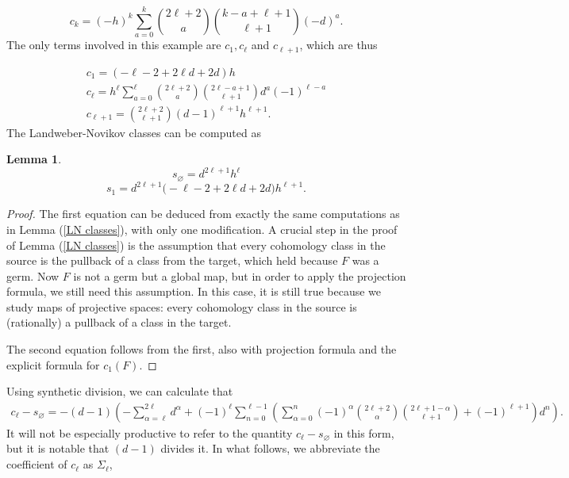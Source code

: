\documentclass[11pt]{article}
\theoremstyle{plain}
\newtheorem{lemma}[fact]{Lemma}
\theoremstyle{definition}
\theoremstyle{definition}
\newcounter{equation}
\let\emptyset\varnothing
\begin{document}
\[
c_k = (-h)^k\sum_{a=0}^k{2\ell+2\choose a}{k-a+\ell+1\choose \ell+1}(-d)^a.
\]
The only terms involved in this example are $c_1, c_\ell$ and $c_{\ell+1}$, which are thus 

\begin{gather*}
c_1=(-\ell-2+2\ell d+2d)h\\
c_\ell = h^\ell\sum_{a=0}^\ell{2\ell+2\choose a}{2\ell-a+1\choose \ell+1}d^a(-1)^{\ell-a}\\
c_{\ell+1} = {2\ell+2\choose \ell+1}(d-1)^{\ell+1}h^{\ell+1}.
\end{gather*}
The Landweber-Novikov classes can be computed as
\begin{lemma}
\[
s_\emptyset = d^{2\ell+1}h^\ell
\]
\[
s_1=d^{2\ell+1}\big(-\ell-2+2\ell d+2d\big)h^{\ell+1}.
\]
\end{lemma}
\begin{proof}
The first equation can be deduced from exactly the same computations as in Lemma (\ref{LN classes}), with only one modification. A crucial step in the proof of Lemma (\ref{LN classes}) is the assumption that every cohomology class in the source is the pullback of a class from the target, which held because $F$ was a germ. Now $F$ is not a germ but a global map, but in order to apply the projection formula, we still need this assumption. In this case, it is still true because we study maps of projective spaces: every cohomology class in the source is (rationally) a pullback of a class in the target. 

The second equation follows from the first, also with projection formula and the explicit formula for $c_1(F)$. 
\end{proof}
Using synthetic division, we can calculate that 
\begin{gather*}
 c_\ell-s_\emptyset = -(d-1)\left(-\sum_{\alpha=\ell}^{2\ell}d^\alpha+(-1)^\ell\sum_{n=0}^{\ell-1}\left(\sum_{\alpha=0}^{n}(-1)^\alpha{2\ell+2\choose \alpha}{2\ell+1-\alpha\choose \ell+1}+(-1)^{\ell+1}\right)d^n\right).
\end{gather*}
It will not be especially productive to refer to the quantity $c_\ell-s_\emptyset$ in this form, but it is notable that $(d-1)$ divides it. In what follows, we abbreviate the coefficient of $c_\ell$ as $\Sigma_\ell$,
\end{document}
